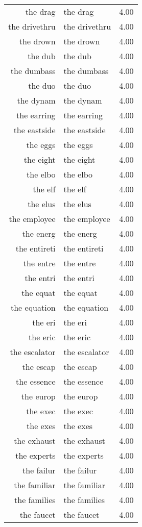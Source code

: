 \begin{table}[ht]
\begin{tabular}{rlr}
  the drag & the drag & 4.00 \\ 
  the drivethru & the drivethru & 4.00 \\ 
  the drown & the drown & 4.00 \\ 
  the dub & the dub & 4.00 \\ 
  the dumbass & the dumbass & 4.00 \\ 
  the duo & the duo & 4.00 \\ 
  the dynam & the dynam & 4.00 \\ 
  the earring & the earring & 4.00 \\ 
  the eastside & the eastside & 4.00 \\ 
  the eggs & the eggs & 4.00 \\ 
  the eight & the eight & 4.00 \\ 
  the elbo & the elbo & 4.00 \\ 
  the elf & the elf & 4.00 \\ 
  the elus & the elus & 4.00 \\ 
  the employee & the employee & 4.00 \\ 
  the energ & the energ & 4.00 \\ 
  the entireti & the entireti & 4.00 \\ 
  the entre & the entre & 4.00 \\ 
  the entri & the entri & 4.00 \\ 
  the equat & the equat & 4.00 \\ 
  the equation & the equation & 4.00 \\ 
  the eri & the eri & 4.00 \\ 
  the eric & the eric & 4.00 \\ 
  the escalator & the escalator & 4.00 \\ 
  the escap & the escap & 4.00 \\ 
  the essence & the essence & 4.00 \\ 
  the europ & the europ & 4.00 \\ 
  the exec & the exec & 4.00 \\ 
  the exes & the exes & 4.00 \\ 
  the exhaust & the exhaust & 4.00 \\ 
  the experts & the experts & 4.00 \\ 
  the failur & the failur & 4.00 \\ 
  the familiar & the familiar & 4.00 \\ 
  the families & the families & 4.00 \\ 
  the faucet & the faucet & 4.00 \\ 

\end{tabular}
\end{table}
